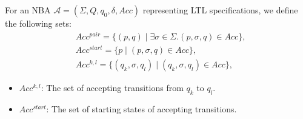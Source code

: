\documentclass[acmlarge]{acmart}
\begin{document}
For an NBA $\mathcal{A} = (\Sigma, Q, q_0, \delta, Acc)$ representing LTL specifications, we define the following sets:
\begin{align}
  & Acc^{pair} = \{(p, q) \mid \exists \sigma \in \Sigma. (p, \sigma, q) \in Acc \}, \label{atpair}\\
  & Acc^{start} = \{p \mid (p, \sigma, q) \in Acc \}, \label{atstart}\\
  & Acc^{k, l} = \{(q_k, \sigma, q_l) \mid (q_k, \sigma, q_l) \in Acc \}, \label{atkl}
\end{align}
\begin{itemize}
    \item $Acc^{k,l}$: The set of accepting transitions from $q_k$ to $q_l$.
    \item $Acc^{start}$: The set of starting states of accepting transitions.
\end{itemize}


\end{document}
